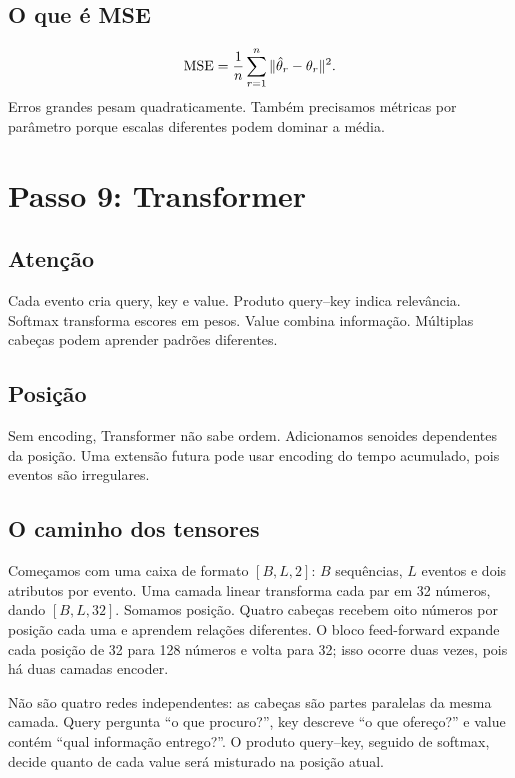 \documentclass[12pt,a4paper,openany]{report}
\begin{document}
\section{O que é MSE}

\[
\operatorname{MSE}=\frac1n\sum_{r=1}^{n}\|\hat\theta_r-\theta_r\|^2.
\]
Erros grandes pesam quadraticamente. Também precisamos métricas por parâmetro porque
escalas diferentes podem dominar a média.

\chapter{Passo 9: Transformer}

\section{Atenção}

Cada evento cria query, key e value. Produto query--key indica relevância. Softmax
transforma escores em pesos. Value combina informação. Múltiplas cabeças podem aprender
padrões diferentes.

\section{Posição}

Sem encoding, Transformer não sabe ordem. Adicionamos senoides dependentes da posição.
Uma extensão futura pode usar encoding do tempo acumulado, pois eventos são irregulares.

\section{O caminho dos tensores}

Começamos com uma caixa de formato \([B,L,2]\): \(B\) sequências, \(L\) eventos e
dois atributos por evento. Uma camada linear transforma cada par em 32 números, dando
\([B,L,32]\). Somamos posição. Quatro cabeças recebem oito números por posição cada
uma e aprendem relações diferentes. O bloco feed-forward expande cada posição de 32
para 128 números e volta para 32; isso ocorre duas vezes, pois há duas camadas encoder.

Não são quatro redes independentes: as cabeças são partes paralelas da mesma camada.
Query pergunta ``o que procuro?'', key descreve ``o que ofereço?'' e value contém
``qual informação entrego?''. O produto query--key, seguido de softmax, decide quanto
de cada value será misturado na posição atual.
\end{document}
